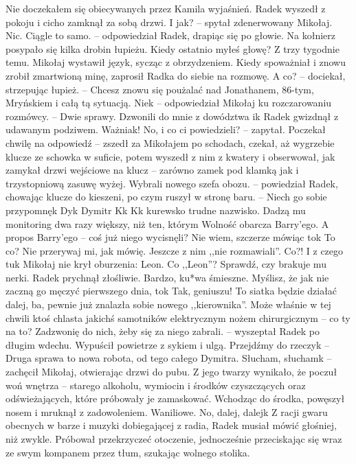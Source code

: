 \documentclass[../MAIN.tex]{subfiles}
\begin{document}
Nie doczekałem się obiecywanych przez Kamila wyjaśnień.
% 
% 
% 
% 
% 
Radek wyszedł z pokoju i cicho zamknął za sobą drzwi.
\sx I jak? -- spytał zdenerwowany Mikołaj.
\xx Nic. Ciągle to samo. -- odpowiedział Radek, drapiąc się po głowie. Na kołnierz posypało się kilka drobin łupieżu.
\xx Kiedy ostatnio myłeś głowę?
\xx Z trzy tygodnie temu.
\qd
Mikołaj wystawił język, sycząc z obrzydzeniem. Kiedy spoważniał i znowu zrobił zmartwioną minę, zaprosił Radka do siebie na rozmowę.
\sx A co? -- dociekał, strzepując łupież. -- Chcesz znowu się poużalać nad Jonathanem, 86-tym, Mryńskiem i całą tą sytuacją.
\xx Nie\3k -- odpowiedział Mikołaj ku rozczarowaniu rozmówcy. -- Dwie sprawy. Dzwonili do mnie z dowództwa i\3k
\qd
Radek gwizdnął z udawanym podziwem.
\sx Ważniak! No, i co ci powiedzieli? -- zapytał.
\qd
Poczekał chwilę na odpowiedź -- zszedł za Mikołajem po schodach, czekał, aż wygrzebie klucze ze schowka w suficie, potem wyszedł z nim z kwatery i obserwował, jak zamykał drzwi wejściowe na klucz -- zarówno zamek pod klamką jak i trzystopniową zasuwę wyżej.
\sx
Wybrali nowego szefa obozu. -- powiedział Radek, chowając klucze do kieszeni, po czym ruszył w stronę baru. -- Niech go sobie przypomnę\3k Dy\3k Dymitr K\3k K\3k kurewsko trudne nazwisko. Dadzą mu monitoring dwa razy większy, niż ten, którym Wolność obarcza Barry’ego.
\xx A propos Barry’ego -- coś już niego wycisnęli?
\xx Nie wiem, szczerze mówiąc to\3k
\xx To co?
\xx Nie przerywaj mi, jak mówię. Jeszcze z nim ,,nie rozmawiali''.
\xx Co?!
\xx I z czego tu\3k
\qd
Mikołaj nie krył oburzenia:
\sx Leon.
\xx Co ,,Leon''?
\xx Sprawdź, czy brakuje mu nerki.
\qd
Radek prychnął złośliwie.
\sx Bardzo, ku*wa śmieszne. Myślisz, że jak nie zaczną go męczyć pierwszego dnia, to\3k
\xx Tak, geniuszu! To siatka będzie działać dalej, ba, pewnie już znalazła sobie nowego ,,kierownika''. Może właśnie w tej chwili ktoś chlasta jakichś samotników elektrycznym nożem chirurgicznym -- co ty na to?
\xx Zadzwonię do nich, żeby się za niego zabrali. -- wyszeptał Radek po długim wdechu. Wypuścił powietrze z sykiem i ulgą. Przejdźmy do rzeczy\3k -- Druga sprawa to nowa robota, od tego całego Dymitra.
\xx Słucham, słucham\3k -- zachęcił Mikołaj, otwierając drzwi do pubu.
\qd
Z jego twarzy wynikało, że poczuł woń wnętrza -- starego alkoholu, wymiocin i środków czyszczących oraz odświeżających, które próbowały je zamaskować. Wchodząc do środka, powęszył nosem i mruknął z zadowoleniem.
\sx Waniliowe. No, dalej, dalej\3k
\qd
Z racji gwaru obecnych w barze i muzyki dobiegającej z radia, Radek musiał mówić głośniej, niż zwykle. Próbował przekrzyczeć otoczenie, jednocześnie przeciskając się wraz ze swym kompanem przez tłum, szukając wolnego stolika.
\end{document}
